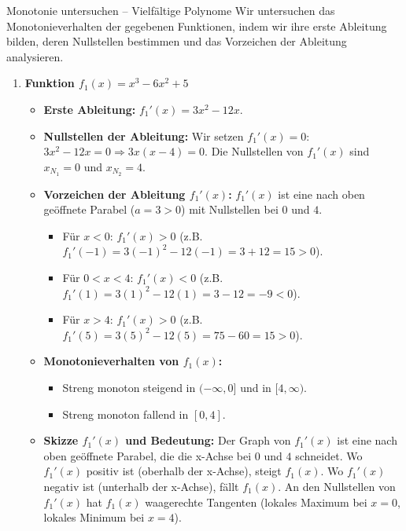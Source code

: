 \begin{loesungsumgebung}{Monotonie untersuchen – Vielfältige Polynome}
Wir untersuchen das Monotonieverhalten der gegebenen Funktionen, indem wir ihre erste Ableitung bilden, deren Nullstellen bestimmen und das Vorzeichen der Ableitung analysieren.

\begin{enumerate}[label=(\alph*)]
    \item \textbf{Funktion $f_1(x) = x^3 - 6x^2 + 5$}
    \begin{itemize}
        \item \textbf{Erste Ableitung:} $f_1'(x) = 3x^2 - 12x$.
        \item \textbf{Nullstellen der Ableitung:} Wir setzen $f_1'(x)=0$:
        $3x^2 - 12x = 0 \Rightarrow 3x(x-4) = 0$.
        Die Nullstellen von $f_1'(x)$ sind $x_{N_1} = 0$ und $x_{N_2} = 4$.
        \item \textbf{Vorzeichen der Ableitung $f_1'(x)$:}
        $f_1'(x)$ ist eine nach oben geöffnete Parabel ($a=3>0$) mit Nullstellen bei $0$ und $4$.
        \begin{itemize}
            \item Für $x < 0$: $f_1'(x) > 0$ (z.B. $f_1'(-1) = 3(-1)^2 - 12(-1) = 3+12=15 > 0$).
            \item Für $0 < x < 4$: $f_1'(x) < 0$ (z.B. $f_1'(1) = 3(1)^2 - 12(1) = 3-12=-9 < 0$).
            \item Für $x > 4$: $f_1'(x) > 0$ (z.B. $f_1'(5) = 3(5)^2 - 12(5) = 75-60=15 > 0$).
        \end{itemize}
        \item \textbf{Monotonieverhalten von $f_1(x)$:}
        \begin{itemize}
            \item Streng monoton steigend in $(-\infty, 0]$ und in $[4, \infty)$.
            \item Streng monoton fallend in $[0, 4]$.
        \end{itemize}
        \item \textbf{Skizze $f_1'(x)$ und Bedeutung:} Der Graph von $f_1'(x)$ ist eine nach oben geöffnete Parabel, die die x-Achse bei $0$ und $4$ schneidet. Wo $f_1'(x)$ positiv ist (oberhalb der x-Achse), steigt $f_1(x)$. Wo $f_1'(x)$ negativ ist (unterhalb der x-Achse), fällt $f_1(x)$. An den Nullstellen von $f_1'(x)$ hat $f_1(x)$ waagerechte Tangenten (lokales Maximum bei $x=0$, lokales Minimum bei $x=4$).
    \end{itemize}


\end{enumerate}
\end{loesungsumgebung}
